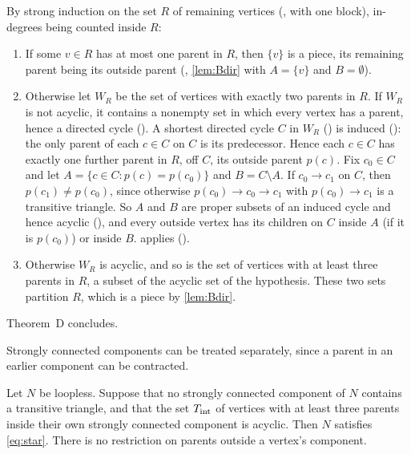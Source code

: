 \begin{outline}
By strong induction on the set $R$ of remaining vertices (, with one block), in-degrees being counted
inside $R$:
\begin{enumerate}[label=(\alph*)]
\item If some $v\in R$ has at most one parent in $R$, then $\{v\}$ is a piece, its remaining parent being its outside
parent (, \cref{lem:Bdir} with $A=\{v\}$ and $B=\emptyset$).
\item Otherwise let $W_R$ be the set of vertices with exactly two parents in $R$. If $W_R$ is not acyclic, it contains a
nonempty set in which every vertex has a parent, hence a directed cycle (). A
shortest directed cycle $C$ in $W_R$ () is induced (): the only parent of each
$c\in C$ on $C$ is its predecessor. Hence each $c\in C$ has exactly one further parent in $R$, off $C$, its outside
parent $p(c)$. Fix $c_0\in C$ and let $A=\{c\in C:p(c)=p(c_0)\}$ and $B=C\setminus A$. If $c_0\to c_1$ on $C$, then
$p(c_1)\ne p(c_0)$, since otherwise $p(c_0)\to c_0\to c_1$ with $p(c_0)\to c_1$ is a transitive triangle. So $A$ and
$B$ are proper subsets of an induced cycle and hence acyclic (), and every outside vertex
has its children on $C$ inside $A$ (if it is $p(c_0)$) or inside $B$.  applies ().
\item Otherwise $W_R$ is acyclic, and so is the set of vertices with at least three parents in $R$, a subset of the
acyclic set of the hypothesis. These two sets partition $R$, which is a piece by \cref{lem:Bdir}.
\end{enumerate}
Theorem~D concludes.
\end{outline}

Strongly connected components can be treated separately, since a parent in an earlier component can be contracted.

\begin{corollary}\label{cor:Tint}
Let $N$ be loopless. Suppose that no strongly connected component of $N$ contains a transitive triangle, and that the set
$T_{\mathrm{int}}$ of vertices with at least three parents inside their own strongly connected component is acyclic. Then $N$
satisfies \eqref{eq:star}. There is no restriction on parents outside a vertex's component.
\end{corollary}

